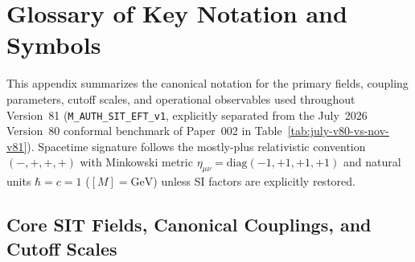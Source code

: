 \appendix

\section{Glossary of Key Notation and Symbols}
\label{sec:notation}
\label{appendix:A}
\label{appendix:B}

This appendix summarizes the canonical notation for the primary fields, coupling parameters, cutoff scales, and operational observables used throughout Version~81 (\texttt{M\_AUTH\_SIT\_EFT\_v1}, explicitly separated from the July~2026 Version~80 conformal benchmark of Paper~002 in Table~\ref{tab:july-v80-vs-nov-v81}). Spacetime signature follows the mostly-plus relativistic convention $(-,+,+,+)$ with Minkowski metric $\eta_{\mu\nu} = \mathrm{diag}(-1,+1,+1,+1)$ and natural units $\hbar = c = 1$ ($[M] = \mathrm{GeV}$) unless SI factors are explicitly restored.

\subsection*{Core SIT Fields, Canonical Couplings, and Cutoff Scales}


